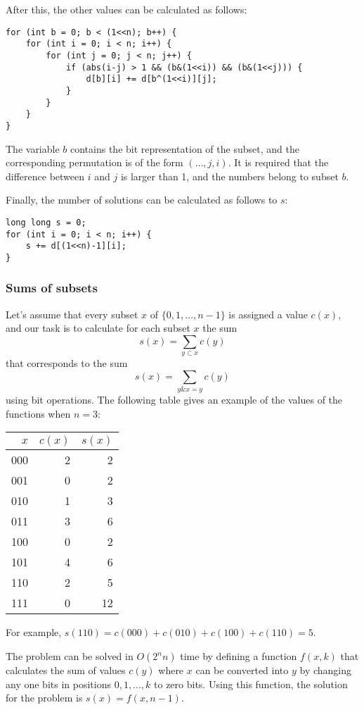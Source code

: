 \noindent
After this, the other values can be calculated
as follows:

\begin{lstlisting}
for (int b = 0; b < (1<<n); b++) {
    for (int i = 0; i < n; i++) {
        for (int j = 0; j < n; j++) {
            if (abs(i-j) > 1 && (b&(1<<i)) && (b&(1<<j))) {
                d[b][i] += d[b^(1<<i)][j];
            }
        }
    }
}
\end{lstlisting}

\noindent
The variable $b$ contains the bit representation
of the subset, and the corresponding
permutation is of the form $(\ldots,j,i)$.
It is required that the difference between
$i$ and $j$ is larger than 1, and the
numbers belong to subset $b$.

Finally, the number of solutions can be
calculated as follows to $s$:

\begin{lstlisting}
long long s = 0;
for (int i = 0; i < n; i++) {
    s += d[(1<<n)-1][i];
}
\end{lstlisting}

\subsubsection{Sums of subsets}

Let's assume that every subset $x$
of $\{0,1,\ldots,n-1\}$
is assigned a value $c(x)$,
and our task is to calculate for
each subset $x$ the sum
\[s(x)=\sum_{y \subset x} c(y)\]
that corresponds to the sum
\[s(x)=\sum_{y \& x = y} c(y)\]
using bit operations.
The following table gives an example of
the values of the functions when $n=3$:
\begin{center}
\begin{tabular}{rrr}
$x$ & $c(x)$ & $s(x)$ \\
\hline
000 & 2 & 2 \\
001 & 0 & 2 \\
010 & 1 & 3 \\
011 & 3 & 6 \\
100 & 0 & 2 \\
101 & 4 & 6 \\
110 & 2 & 5 \\
111 & 0 & 12 \\
\end{tabular}
\end{center}
For example, $s(110)=c(000)+c(010)+c(100)+c(110)=5$. 

The problem can be solved in $O(2^n n)$ time
by defining a function $f(x,k)$ that calculates
the sum of values $c(y)$ where $x$ can be
converted into $y$ by changing any one bits
in positions $0,1,\ldots,k$ to zero bits.
Using this function, the solution for the
problem is $s(x)=f(x,n-1)$.

